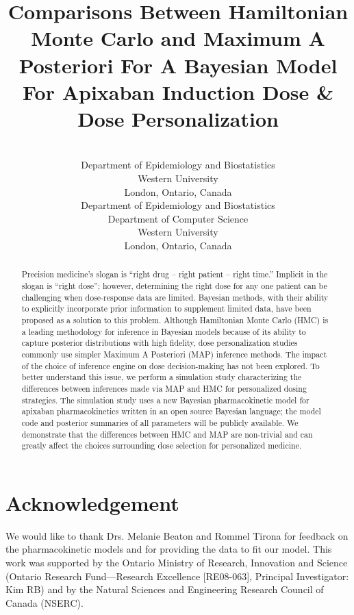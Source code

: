 \documentclass[pmlr]{jmlr}%
\title[Comparisons Between HMC And MAP For  Dose Personalization]{Comparisons Between Hamiltonian Monte Carlo and Maximum A Posteriori For A Bayesian Model For Apixaban Induction Dose \& Dose Personalization}
\author{\Name{A. Demetri Pananos}
       \Email{apananos@uwo.ca}\\ 
       \addr Department of Epidemiology and Biostatistics\\
       Western University\\
		London, Ontario, Canada
       \AND
       \Name{Daniel J. Lizotte}
       \Email{dlizotte@uwo.ca}\\ 
       \addr Department of Epidemiology and Biostatistics\\
       Department of Computer Science\\
       Western University\\
       London, Ontario, Canada}
\begin{document}
\maketitle

\begin{abstract}
Precision medicine’s slogan is “right drug -- right patient -- right time.” Implicit in the slogan is ``right dose''; however, determining the right dose for any one patient can be challenging when dose-response data are limited. Bayesian methods, with their ability to explicitly incorporate prior information to supplement limited data, have been proposed as a solution to this problem. Although Hamiltonian Monte Carlo (HMC) is a leading methodology for inference in Bayesian models because of its ability to capture posterior distributions with high fidelity, dose personalization studies commonly use simpler Maximum A Posteriori (MAP) inference methods. The impact of the choice of inference engine on dose decision-making has not been explored.   To better understand this issue, we perform a simulation study characterizing the differences between inferences made via MAP and HMC for personalized dosing strategies. The simulation study uses a new Bayesian pharmacokinetic model for apixaban pharmacokinetics written in an open source Bayesian language; the model code and posterior summaries of all parameters will be publicly available. We demonstrate that the differences between HMC and MAP are non-trivial and can greatly affect the choices surrounding dose selection for personalized medicine.

\end{abstract}







\section*{Acknowledgement}

We would like to thank Drs. Melanie Beaton and Rommel Tirona for feedback on the pharmacokinetic models and for providing the data to fit our model.  This work was supported by the Ontario Ministry of Research, Innovation and Science (Ontario Research Fund---Research Excellence [RE08-063], Principal Investigator: Kim RB) and by the Natural Sciences and Engineering Research Council of Canada (NSERC).




\newpage


\end{document}
